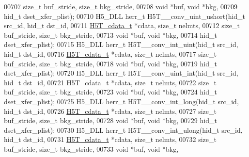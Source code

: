 \begin{DoxyCode}
00707                    \textcolor{keywordtype}{size\_t} buf\_stride, \textcolor{keywordtype}{size\_t} bkg\_stride,
00708                                    \textcolor{keywordtype}{void} *buf, \textcolor{keywordtype}{void} *bkg,
00709                                    hid\_t dset\_xfer\_plist);
00710 H5\_DLL herr\_t H5T\_\_conv\_uint\_ushort(hid\_t src\_id, hid\_t dst\_id,
00711                     \hyperlink{struct_h5_t__cdata__t}{H5T\_cdata\_t} *cdata, \textcolor{keywordtype}{size\_t} nelmts,
00712                     \textcolor{keywordtype}{size\_t} buf\_stride, \textcolor{keywordtype}{size\_t} bkg\_stride,
00713                                     \textcolor{keywordtype}{void} *buf, \textcolor{keywordtype}{void} *bkg,
00714                                     hid\_t dset\_xfer\_plist);
00715 H5\_DLL herr\_t H5T\_\_conv\_int\_uint(hid\_t src\_id, hid\_t dst\_id,
00716                  \hyperlink{struct_h5_t__cdata__t}{H5T\_cdata\_t} *cdata, \textcolor{keywordtype}{size\_t} nelmts,
00717                  \textcolor{keywordtype}{size\_t} buf\_stride, \textcolor{keywordtype}{size\_t} bkg\_stride,
00718                                  \textcolor{keywordtype}{void} *buf, \textcolor{keywordtype}{void} *bkg,
00719                                  hid\_t dset\_xfer\_plist);
00720 H5\_DLL herr\_t H5T\_\_conv\_uint\_int(hid\_t src\_id, hid\_t dst\_id,
00721                  \hyperlink{struct_h5_t__cdata__t}{H5T\_cdata\_t} *cdata, \textcolor{keywordtype}{size\_t} nelmts,
00722                  \textcolor{keywordtype}{size\_t} buf\_stride, \textcolor{keywordtype}{size\_t} bkg\_stride,
00723                                  \textcolor{keywordtype}{void} *buf, \textcolor{keywordtype}{void} *bkg,
00724                                  hid\_t dset\_xfer\_plist);
00725 H5\_DLL herr\_t H5T\_\_conv\_int\_long(hid\_t src\_id, hid\_t dst\_id,
00726                  \hyperlink{struct_h5_t__cdata__t}{H5T\_cdata\_t} *cdata, \textcolor{keywordtype}{size\_t} nelmts,
00727                  \textcolor{keywordtype}{size\_t} buf\_stride, \textcolor{keywordtype}{size\_t} bkg\_stride,
00728                                  \textcolor{keywordtype}{void} *buf, \textcolor{keywordtype}{void} *bkg,
00729                                  hid\_t dset\_xfer\_plist);
00730 H5\_DLL herr\_t H5T\_\_conv\_int\_ulong(hid\_t src\_id, hid\_t dst\_id,
00731                   \hyperlink{struct_h5_t__cdata__t}{H5T\_cdata\_t} *cdata, \textcolor{keywordtype}{size\_t} nelmts,
00732                   \textcolor{keywordtype}{size\_t} buf\_stride, \textcolor{keywordtype}{size\_t} bkg\_stride,
00733                                   \textcolor{keywordtype}{void} *buf, \textcolor{keywordtype}{void} *bkg,

\end{DoxyCode}
